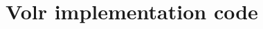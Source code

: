 \documentclass[a4paper,oneside]{memoir}
\begin{document}
\begin{comment}
\chapter{Discussion} \label{sec:discussion}

\end{comment}

\appendix
\chapter{Volr implementation code} \label{app:implementation}
  

\backmatter

\printglossary

\printbibliography
 
\printindex
\end{document}
